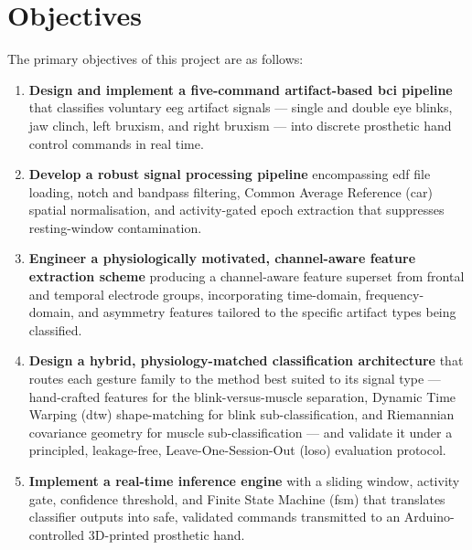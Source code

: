\section{Objectives}
\label{sec:objectives}

The primary objectives of this project are as follows:

\begin{enumerate}[leftmargin=*, label=\textbf{O\arabic*.}]

    \item \textbf{Design and implement a five-command artifact-based
    \acrshort{bci} pipeline} that classifies voluntary
    \acrshort{eeg} artifact signals — single and double eye blinks,
    jaw clinch, left bruxism, and right bruxism — into discrete
    prosthetic hand control commands in real time.

    \item \textbf{Develop a robust signal processing pipeline}
    encompassing \acrshort{edf} file loading, notch and bandpass
    filtering, Common Average Reference (\acrshort{car}) spatial
    normalisation, and activity-gated epoch extraction that
    suppresses resting-window contamination.

    \item \textbf{Engineer a physiologically motivated, channel-aware
    feature extraction scheme} producing a channel-aware feature
    superset from frontal and temporal electrode groups, incorporating
    time-domain, frequency-domain, and asymmetry features tailored
    to the specific artifact types being classified.

    \item \textbf{Design a hybrid, physiology-matched classification
    architecture} that routes each gesture family to the method best
    suited to its signal type — hand-crafted features for the
    blink-versus-muscle separation, Dynamic Time Warping
    (\acrshort{dtw}) shape-matching for blink sub-classification, and
    Riemannian covariance geometry for muscle sub-classification —
    and validate it under a principled, leakage-free,
    Leave-One-Session-Out (\acrshort{loso}) evaluation protocol.

    \item \textbf{Implement a real-time inference engine} with a
    sliding window, activity gate, confidence threshold, and Finite
    State Machine (\acrshort{fsm}) that translates classifier outputs
    into safe, validated commands transmitted to an Arduino-controlled
    3D-printed prosthetic hand.


\end{enumerate}

